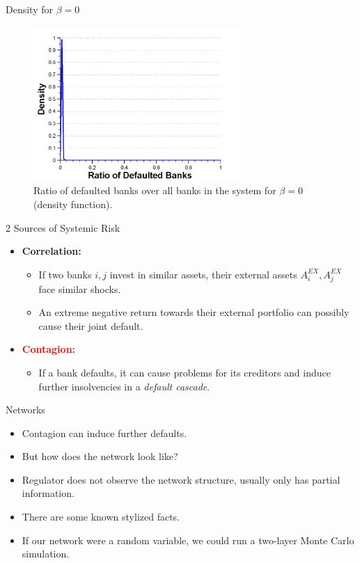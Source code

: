 \documentclass{beamer}
\begin{document}
\begin{frame}{Density for $\beta=0$}
\begin{figure}[ht]
	\centering
		\includegraphics[width=0.7\textwidth]{images/ErdosRenyi_normal_beta_0_p_14}
	\caption{Ratio of defaulted banks over all banks in the system for $\beta=0$ (density function).}
	\label{fig:CreditRiskPicture}
\end{figure}
\end{frame}

\begin{frame}{2 Sources of Systemic Risk}
	\begin{itemize}
		\item \textbf{Correlation:}
		\begin{itemize}
			\item If two banks $i,j$ invest in similar assets, their external assets $A^{EX}_i,A^{EX}_j$ face similar shocks.
			\item An extreme negative return towards their external portfolio can possibly cause their joint default.
		\end{itemize}
		\item \textcolor{red}{\textbf{Contagion:}}
		\begin{itemize}
			\item If a bank defaults, it can cause problems for its creditors and induce further insolvencies in a \textit{default cascade}.
		\end{itemize}
	\end{itemize}
\end{frame}

\begin{frame}{Networks}
\begin{itemize}
	\item Contagion can induce further defaults.
	\item But how does the network look like?
	\item Regulator does not observe the network structure, usually only has partial information.
	\item There are some known stylized facts.
	\item If our network were a random variable, we could run a two-layer Monte Carlo simulation.
\end{itemize}
\end{frame}
\end{document}
